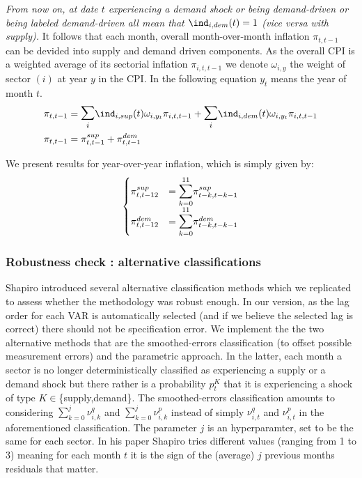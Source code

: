 \textit{From now on, at date $t$ experiencing a demand shock or being demand-driven or being labeled demand-driven all mean that $ \ind_{i,dem}(t)=1$ (vice versa with supply).}
\bigbreak
It follows that each month, overall month-over-month inflation $\pi_{t,t-1}$ can be devided into supply and demand driven components. 
As the overall CPI is a weighted average of its sectorial inflation $\pi_{i,t,t-1}$ we denote $\omega_{i,y}$ the weight of sector $(i)$ at year $y$ in the CPI.
In the following equation $y_t$ means the year of month $t$.
\begin{align*}
    \pi_{t,t-1} &= \mathlarger{\mathlarger{\sum}}_{i} \ind_{i,sup}(t) \omega_{i,y_t} \pi_{i,t,t-1} + \mathlarger{\mathlarger{\sum}}_{i} \ind_{i,dem}(t) \omega_{i,y_t} \pi_{i,t,t-1} \\
    \pi_{t,t-1} &= \pi_{t,t-1}^{sup} + \pi_{t,t-1}^{dem}
\end{align*}

We present results for year-over-year inflation, which is simply given by:
\begin{align*}
    \begin{cases}
        \pi_{t,t-12}^{sup} &= \mathlarger{\mathlarger{\sum}}_{k=0}^{11} \pi_{t-k,t-k-1}^{sup} \\
        \pi_{t,t-12}^{dem} &= \mathlarger{\mathlarger{\sum}}_{k=0}^{11} \pi_{t-k,t-k-1}^{dem}
    \end{cases}
\end{align*}

\subsubsection{Robustness check : alternative classifications}

\quad Shapiro introduced several alternative classification methods which we replicated to assess whether the methodology was robust enough.
In our version, as the lag order for each VAR is automatically selected (and if we believe the selected lag is correct) there should not be specification error.
\bigbreak
We implement the the two alternative methods that are the smoothed-errors classification (to offset possible measurement errors) and the parametric approach. 
In the latter, each month a sector is no longer deterministically classified as experiencing a supply or a demand shock but there rather is a probability $p_t^K$ that it is experiencing a shock of type $K \in$\{supply,demand\}.
\bigbreak
The smoothed-errors classification amounts to considering $\sum_{k=0}^{j} \nu_{i,k}^{q}$ and $\sum_{k=0}^{j} \nu_{i,k}^{p}$ instead of simply $\nu_{i,t}^{q}$ and $\nu_{i,t}^{p}$ in the aforementioned classification. 
The parameter $j$ is an hyperparamter, set to be the same for each sector. In his paper Shapiro tries different values (ranging from 1 to 3) meaning for each month $t$ it is the sign of the (average) $j$ previous months residuals that matter.


